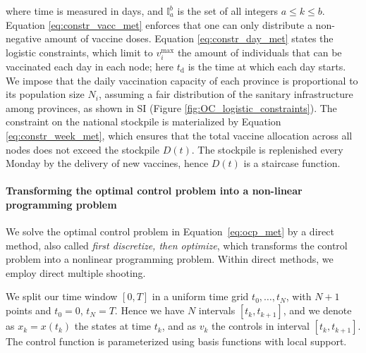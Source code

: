 where time is measured in days, and $\mathbb{I}_a^b$ is the set of all integers $a\leq k\leq b$. Equation \eqref{eq:constr_vacc_met} enforces that one can only distribute a non-negative amount of vaccine doses. Equation \eqref{eq:constr_day_met} states the logistic constraints, which limit to $v_i^\mathrm{max}$ the amount of individuals that can be vaccinated each day in each node; here $t_\mathrm{d}$ is the time at which each day starts. We impose that the daily vaccination capacity of each province is proportional to its population size $N_i$, assuming a fair distribution of the sanitary infrastructure among provinces, as shown in SI (Figure \ref{fig:OC_logistic_constraints}). The constraint on the national stockpile is materialized by Equation
\eqref{eq:constr_week_met}, which ensures that the total vaccine allocation across all nodes does not exceed the stockpile $D(t)$. The stockpile is replenished every Monday by the delivery of new vaccines, hence $D(t)$ is a staircase function.



\paragraph{Transforming the optimal control problem into a non-linear programming problem}


We solve the optimal control problem in Equation~\eqref{eq:ocp_met} by a direct method, also called \emph{first discretize, then optimize}, which transforms the control problem into a nonlinear programming problem. Within direct methods, we employ direct multiple shooting. 


We split our time window $[0,T]$ in a uniform time grid $t_0,\ldots,t_N$, with $N+1$ points and $t_0=0$, $t_N=T$. Hence we have $N$ intervals $[t_k,t_{k+1}]$, and we denote as $x_k=x(t_k)$ the states at time $t_k$, and as $v_k$ the controls in interval $[t_k,t_{k+1}]$. The control function is parameterized using basis functions with local support. 


